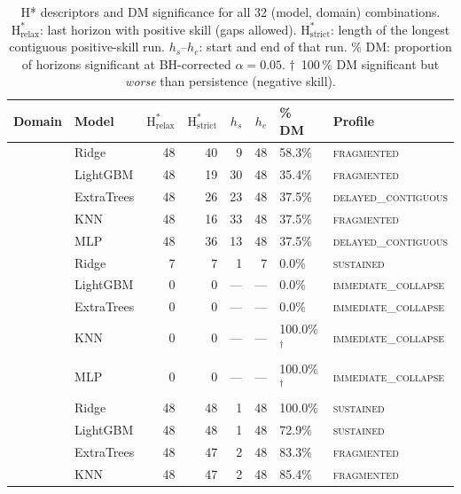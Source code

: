 \documentclass[pdflatex,sn-mathphys]{sn-jnl}
\newcommand{\Hrelax}{$\text{H}^*_{\text{relax}}$}
\newcommand{\Hstrict}{$\text{H}^*_{\text{strict}}$}
\begin{document}
\begin{table}[ht]
\centering
\caption{H* descriptors and DM significance for all 32 (model, domain)
combinations. \Hrelax: last horizon with positive skill (gaps allowed).
\Hstrict: length of the longest contiguous positive-skill run.
$h_s$--$h_e$: start and end of that run.
\% DM: proportion of horizons significant at BH-corrected $\alpha=0.05$.
$\dagger$~100\,\% DM significant but \emph{worse} than persistence (negative skill).}
\label{tab:results}
\scriptsize
\setlength{\tabcolsep}{2.6pt}
\renewcommand{\arraystretch}{1.12}
\begin{tabularx}{\textwidth}{llrrrrlX}
\toprule
Domain & Model & \Hrelax & \Hstrict & $h_s$ & $h_e$ & \% DM & Profile \\
\midrule
{}
  & Ridge      & 48 & 40 &  9 & 48 & 58.3\% & \textsc{fragmented} \\
  & LightGBM   & 48 & 19 & 30 & 48 & 35.4\% & \textsc{fragmented} \\
  & ExtraTrees & 48 & 26 & 23 & 48 & 37.5\% & \textsc{delayed\_contiguous} \\
  & KNN        & 48 & 16 & 33 & 48 & 37.5\% & \textsc{fragmented} \\
  & MLP        & 48 & 36 & 13 & 48 & 37.5\% & \textsc{delayed\_contiguous} \\
\midrule
{}
  & Ridge      &  7 &  7 &  1 &  7 &   0.0\%           & \textsc{sustained} \\
  & LightGBM   &  0 &  0 & ---& ---&   0.0\%           & \textsc{immediate\_collapse} \\
  & ExtraTrees &  0 &  0 & ---& ---&   0.0\%           & \textsc{immediate\_collapse} \\
  & KNN        &  0 &  0 & ---& ---& 100.0\%$^\dagger$ & \textsc{immediate\_collapse} \\
  & MLP        &  0 &  0 & ---& ---& 100.0\%$^\dagger$ & \textsc{immediate\_collapse} \\
\midrule
{}
  & Ridge        & 48 & 48 &  1 & 48 & 100.0\% & \textsc{sustained} \\
  & LightGBM     & 48 & 48 &  1 & 48 &  72.9\% & \textsc{sustained} \\
  & ExtraTrees   & 48 & 47 &  2 & 48 &  83.3\% & \textsc{fragmented} \\
  & KNN          & 48 & 47 &  2 & 48 &  85.4\% & \textsc{fragmented} \\

\end{tabularx}
\end{table}
\end{document}
